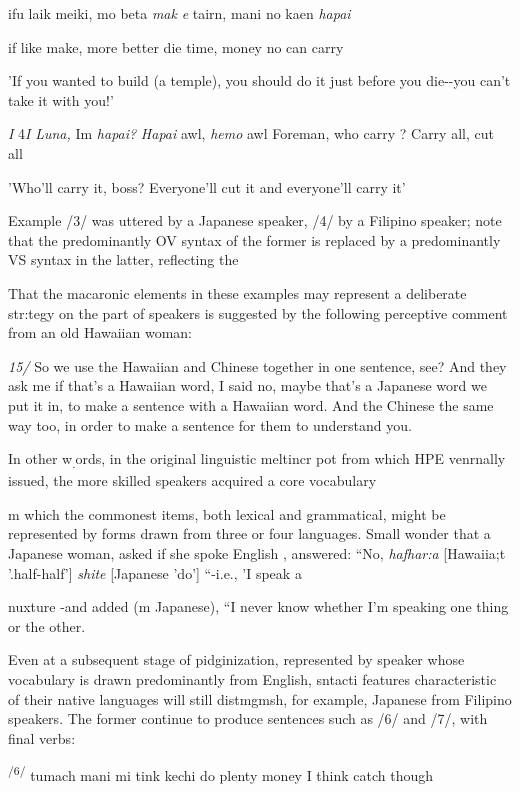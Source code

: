 \ea\label{ex:3}
 ifu laik meiki, mo beta \textit{mak} \textit{e} tairn, mani no kaen \textit{hapai}
\glt
\z

if like make, more better die time, money no can carry

'If you wanted to build (a temple), you should do it just before you die-{}-you can't take it with you!'

\textit{I} 4\textit{I }\textit{Luna,} Im \textit{hapai?} \textit{Hapai} awl, \textit{hemo} awl Foreman, who carry ? Carry all, cut all

'Who'll carry it, boss? Everyone'll cut it and everyone'll carry it'

Example /3/ was uttered by a Japanese speaker, /4/ by a Filipino speaker; note that the predominantly OV syntax of the former is replaced by a predominantly VS syntax in the latter, reflecting the

That the macaronic elements in these examples may represent a deliber\-ate str:tegy on the part of speakers is suggested by the following perceptive comment from an old Hawaiian woman:

\textit{15/} So we use the Hawaiian and Chinese together in one sentence, see? And they ask me if that's a Hawaiian word, I said no, maybe that's a Japanese word we put it in, to make a sentence with a Hawaiian word. And the Chinese the same way too, in order to make a sentence for them to understand you.

In other w\textsubscript{.}ords, in the original linguistic meltincr pot from which HPE venrnally issued, the more skilled speakers acquired a core vocabulary

m which the commonest items, both lexical and grammatical, might be represented by forms drawn from three or four languages. Small won\-der that a Japanese woman, asked if she spoke English , answered: ``No, \textit{haf{\textquotedbl}{\textquotedbl}har:a} [Hawaiia;t '.half-half'] \textit{shite} [Japanese 'do'] ``{}-i.e., 'I speak a

nuxture {}-and added (m Japanese), ``I never know whether I'm speaking one thing or the other.{\textquotedbl}

Even at a subsequent stage of pidginization, represented by speaker whose vocabulary is drawn predominantly from English, sntacti features characteristic of their native languages will still distmgmsh, for example, Japanese from Filipino speakers. The former continue to produce sentences such as /6/ and /7/, with final verbs:

\textsuperscript{/6/ }tumach mani mi tink kechi do plenty money I think catch though

